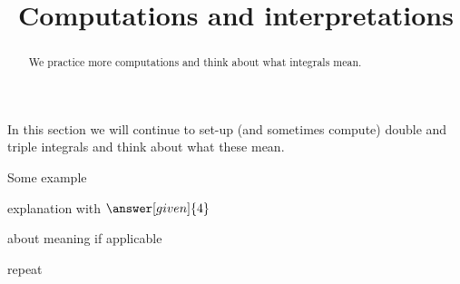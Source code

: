 \documentclass{ximera}
\title[Dig-In:]{Computations and interpretations}
\begin{document}
\begin{abstract}
  We practice more computations and think about what integrals mean.
\end{abstract}
\maketitle

In this section we will continue to set-up (and sometimes compute)
double and triple integrals and think about what these mean.

\begin{example}
  Some example
  \begin{explanation}
    explanation with $\answer[given]{4}$
  \end{explanation}
\end{example}

\begin{question}
  about meaning if applicable
\end{question}

repeat
\end{document}
